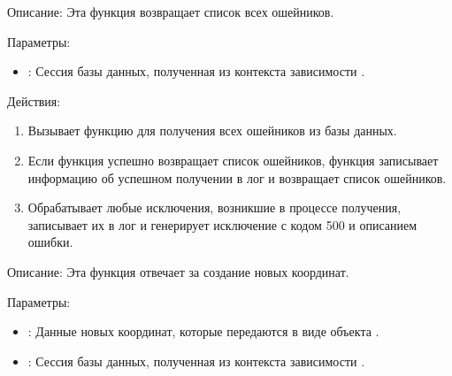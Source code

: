 \documentclass[letterpaper,10pt,russian]{sphinxmanual}
\begin{document}
\sphinxAtStartPar
{}

\sphinxAtStartPar
Описание: Эта функция возвращает список всех ошейников.

\sphinxAtStartPar
Параметры:
\begin{itemize}
\item {} 
\sphinxAtStartPar
{}: Сессия базы данных, полученная из контекста зависимости .

\end{itemize}

\sphinxAtStartPar
Действия:
\begin{enumerate}
%
\item {} 
\sphinxAtStartPar
Вызывает функцию  для получения всех ошейников из базы данных.

\item {} 
\sphinxAtStartPar
Если функция  успешно возвращает список ошейников, функция записывает информацию об успешном получении в лог и возвращает список ошейников.

\item {} 
\sphinxAtStartPar
Обрабатывает любые исключения, возникшие в процессе получения, записывает их в лог и генерирует исключение  с кодом 500 и описанием ошибки.

\end{enumerate}

\sphinxAtStartPar
{}

\sphinxAtStartPar
Описание: Эта функция отвечает за создание новых координат.

\sphinxAtStartPar
Параметры:
\begin{itemize}
\item {} 
\sphinxAtStartPar
{}: Данные новых координат, которые передаются в виде объекта .

\item {} 
\sphinxAtStartPar
{}: Сессия базы данных, полученная из контекста зависимости .

\end{itemize}
\end{document}
